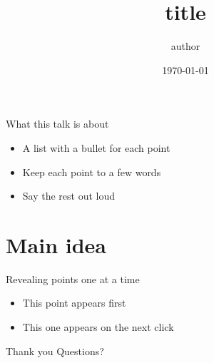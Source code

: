 \documentclass[aspectratio=169]{beamer}
\title{{{title}}}
\author{{{author}}}
\date{\today}
\begin{document}
\begin{frame}
  \titlepage
\end{frame}

\begin{frame}{What this talk is about}
  \begin{itemize}
    \item A list with a bullet for each point
    \item Keep each point to a few words
    \item Say the rest out loud
  \end{itemize}
\end{frame}

\section{Main idea}

\begin{frame}{Revealing points one at a time}
  \begin{itemize}
    \item<1-> This point appears first
    \item<2-> This one appears on the next click
  \end{itemize}
\end{frame}

\begin{frame}{Thank you}
  Questions?
\end{frame}
\end{document}
